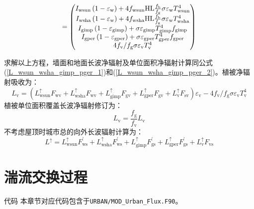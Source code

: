 \begin{landscape}
\begin{equation}
\begin{split}
      =\left(\begin{matrix}I_{\mathrm{wsun}}\left(1-\varepsilon_{\rm w}\right)+4f_{\mathrm{wsun}} {\rm HL} \frac{f_{\rm b}}{f_{\rm g}} \sigma\varepsilon_{\rm w}T_{\mathrm{wsun}}^4 \\
          I_{\mathrm{wsha}}\left(1-\varepsilon_{\rm w}\right)+4f_{\mathrm{wsha}}{ \rm HL} \frac{f_{\rm b}}{f_{\rm g}}\sigma\varepsilon_{\rm w}T_{\mathrm{wsha}}^4  \\
          I_{\mathrm{gimp}}\left(1-\varepsilon_{\mathrm{gimp}}\right)+\sigma\varepsilon_{\mathrm{gimp}}T_{\mathrm{gimp}}^4f_{\mathrm{gimp}} \\
          I_{\mathrm{gper}}\left(1-\varepsilon_{\mathrm{gper}}\right)+\sigma\varepsilon_{\mathrm{gper}}T_{\mathrm{gper}}^4f_{\mathrm{gper}}\\
      4f_{\rm v}/f_{\rm g}\sigma\varepsilon_{\rm v}T_{\rm v}^4\\\end{matrix}\right)
    \end{split}
  \end{equation}
\end{landscape}

求解以上方程，墙面和地面长波净辐射及单位面积净辐射计算同公式(\ref{L_wsun_wsha_gimp_pger_1})和(\ref{L_wsun_wsha_gimp_pger_2})。植被净辐射吸收为：
\begin{equation}
  L_{\mathrm{v}}=\left(L_{\mathrm{wsun}}^{\uparrow} F_{\mathrm{wv}}+L_{\mathrm{wsha}}^{\uparrow} F_{\mathrm{wv}}+L_{\mathrm{gimp}}^{\uparrow} F_{\mathrm{gv}}+L_{\mathrm{gper}}^{\uparrow} F_{\mathrm{g v}}+L_{\mathrm{v}}^{\uparrow} F_{\mathrm{sv}}\right) \varepsilon_{\mathrm{v}}-4 f_{\mathrm{v}} / f_{\mathrm{g}} \sigma \varepsilon_{\mathrm{v}} T_{\mathrm{v}}^{4}
\end{equation}
植被单位面积覆盖长波净辐射修订为：
\begin{equation}
  L_{\mathrm{v}}=\frac{f_{\mathrm{g}}}{f_{\mathrm{v}}} L_{\mathrm{v}}
\end{equation}
不考虑屋顶时城市总的向外长波辐射计算为：
\begin{equation}
  L^{\uparrow}=L_{\mathrm{wsun}}^{\uparrow} F_{\mathrm{ws}}^{\prime}+L_{\mathrm{wsha}}^{\uparrow} F_{\mathrm{ws}}^{\prime}+L_{\mathrm{gimp}}^{\uparrow} F_{\mathrm{gs}}^{\prime}+L_{\mathrm{gper}}^{\uparrow} F_{\mathrm{gs}}^{\prime}+L_{\mathrm{v}}^{\uparrow} F_{\mathrm{v s}}
\end{equation}
\section{湍流交换过程}\label{城市湍流过程}
\begin{mymdframed}{代码}
  本章节对应代码包含于\texttt{URBAN/MOD\_Urban\_Flux.F90}。
\end{mymdframed}

